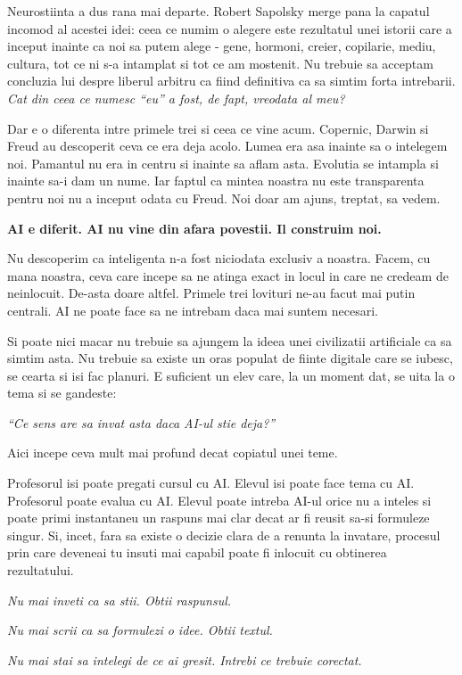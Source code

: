 Neurostiinta a dus rana mai departe. Robert Sapolsky merge pana la
capatul incomod al acestei idei: ceea ce numim o alegere este rezultatul
unei istorii care a inceput inainte ca noi sa putem alege - gene,
hormoni, creier, copilarie, mediu, cultura, tot ce ni s-a intamplat si
tot ce am mostenit. Nu trebuie sa acceptam concluzia lui despre liberul
arbitru ca fiind definitiva ca sa simtim forta intrebarii.
\textit{Cat din ceea ce numesc ``eu'' a fost, de fapt, vreodata al meu?}

Dar e o diferenta intre primele trei si ceea ce vine acum. Copernic,
Darwin si Freud au descoperit ceva ce era deja acolo. Lumea era asa
inainte sa o intelegem noi. Pamantul nu era in centru si inainte sa
aflam asta. Evolutia se intampla si inainte sa-i dam un nume. Iar faptul
ca mintea noastra nu este transparenta pentru noi nu a inceput odata cu
Freud. Noi doar am ajuns, treptat, sa vedem.

\textbf{AI e diferit. AI nu vine din afara povestii. Il construim noi.}

Nu descoperim ca inteligenta n-a fost niciodata exclusiv a noastra.
Facem, cu mana noastra, ceva care incepe sa ne atinga exact in locul in
care ne credeam de neinlocuit. De-asta doare altfel. Primele trei
lovituri ne-au facut mai putin centrali. AI ne poate face sa ne intrebam
daca mai suntem necesari.

Si poate nici macar nu trebuie sa ajungem la ideea unei civilizatii
artificiale ca sa simtim asta. Nu trebuie sa existe un oras populat de
fiinte digitale care se iubesc, se cearta si isi fac planuri. E
suficient un elev care, la un moment dat, se uita la o tema si se
gandeste:

\textit{``Ce sens are sa invat asta daca AI-ul stie deja?''}

Aici incepe ceva mult mai profund decat copiatul unei teme.

Profesorul isi poate pregati cursul cu AI. Elevul isi poate face tema cu
AI. Profesorul poate evalua cu AI. Elevul poate intreba AI-ul orice nu a
inteles si poate primi instantaneu un raspuns mai clar decat ar fi
reusit sa-si formuleze singur. Si, incet, fara sa existe o decizie clara
de a renunta la invatare, procesul prin care deveneai tu insuti mai
capabil poate fi inlocuit cu obtinerea rezultatului.

\textit{Nu mai inveti ca sa stii. Obtii raspunsul.}

\textit{Nu mai scrii ca sa formulezi o idee. Obtii textul.}

\textit{Nu mai stai sa intelegi de ce ai gresit. Intrebi ce trebuie
corectat.}

